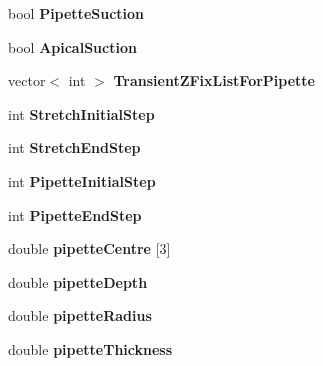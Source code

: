 \begin{DoxyCompactItemize}
\item 
\hypertarget{classSimulation_a10cfa63b384b954f5ea34afca788f298}{}bool {\bfseries Pipette\+Suction}\label{classSimulation_a10cfa63b384b954f5ea34afca788f298}

\item 
\hypertarget{classSimulation_a53d18b41ab9318966acb05815ab4deb0}{}bool {\bfseries Apical\+Suction}\label{classSimulation_a53d18b41ab9318966acb05815ab4deb0}

\item 
\hypertarget{classSimulation_a614017cf64e201c1897117b6ce31e17c}{}vector$<$ int $>$ {\bfseries Transient\+Z\+Fix\+List\+For\+Pipette}\label{classSimulation_a614017cf64e201c1897117b6ce31e17c}

\item 
\hypertarget{classSimulation_a973663e403ae2b5596f10f7933111c93}{}int {\bfseries Stretch\+Initial\+Step}\label{classSimulation_a973663e403ae2b5596f10f7933111c93}

\item 
\hypertarget{classSimulation_a4549e150051a2d4c7e9bb5d7c8194131}{}int {\bfseries Stretch\+End\+Step}\label{classSimulation_a4549e150051a2d4c7e9bb5d7c8194131}

\item 
\hypertarget{classSimulation_ab3f29a12d0630213fe58e14a0e198ca0}{}int {\bfseries Pipette\+Initial\+Step}\label{classSimulation_ab3f29a12d0630213fe58e14a0e198ca0}

\item 
\hypertarget{classSimulation_a7382cfd6abf17a8067e86cabf68f512f}{}int {\bfseries Pipette\+End\+Step}\label{classSimulation_a7382cfd6abf17a8067e86cabf68f512f}

\item 
\hypertarget{classSimulation_a80ba175cfd0377ddab49a0058139f03c}{}double {\bfseries pipette\+Centre} \mbox{[}3\mbox{]}\label{classSimulation_a80ba175cfd0377ddab49a0058139f03c}

\item 
\hypertarget{classSimulation_a6d987f6569d306688d272436294e85f4}{}double {\bfseries pipette\+Depth}\label{classSimulation_a6d987f6569d306688d272436294e85f4}

\item 
\hypertarget{classSimulation_a44f9a496fd5dcdb27e7e425350cfa5ae}{}double {\bfseries pipette\+Radius}\label{classSimulation_a44f9a496fd5dcdb27e7e425350cfa5ae}

\item 
\hypertarget{classSimulation_a330bde4b57359e57318c1105edde06c5}{}double {\bfseries pipette\+Thickness}\label{classSimulation_a330bde4b57359e57318c1105edde06c5}


\end{DoxyCompactItemize}
